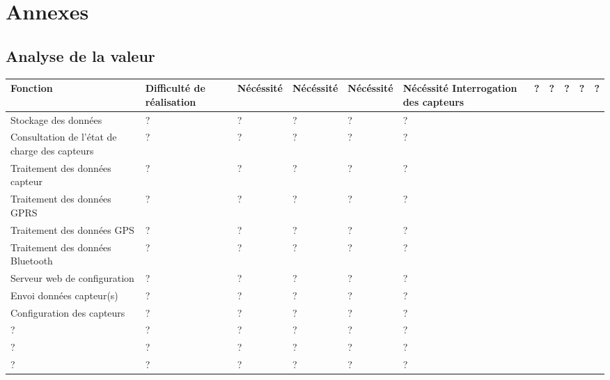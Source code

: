 \vfil
\pagebreak
\section{Annexes}

\subsection{Analyse de la valeur}

\begin{center}
\begin{longtable}{|m{6cm}|m{17mm}|m{17mm}|m{17mm}|}
\hline
Fonction & Difficulté de réalisation & Nécéssité & Nécéssité & Nécéssité & Nécéssité\endhead
\hline
Interrogation des capteurs
& %
?
& %
?
& %
?
& %
?
& %
?
\\\hline%
Stockage des données
& %
?
& %
?
& %
?
& %
?
& %
?
\\\hline%
Consultation de l'état de charge des capteurs
& %
?
& %
?
& %
?
& %
?
& %
?
\\\hline%
Traitement des données capteur
& %
?
& %
?
& %
?
& %
?
& %
?
\\\hline%
Traitement des données GPRS
& %
?
& %
?
& %
?
& %
?
& %
?
\\\hline%
Traitement des données GPS
& %
?
& %
?
& %
?
& %
?
& %
?
\\\hline%
Traitement des données Bluetooth
& %
?
& %
?
& %
?
& %
?
& %
?
\\\hline%
Serveur web de configuration
& %
?
& %
?
& %
?
& %
?
& %
?
\\\hline%
Envoi données capteur(s)
& %
?
& %
?
& %
?
& %
?
& %
?
\\\hline%
Configuration des capteurs
& %
?
& %
?
& %
?
& %
?
& %
?
\\\hline%
?
& %
?
& %
?
& %
?
& %
?
& %
?
\\\hline%
?
& %
?
& %
?
& %
?
& %
?
& %
?
\\\hline%
?
& %
?
& %
?
& %
?
& %
?
& %
?
\\\hline
\end{longtable}
\end{center}
